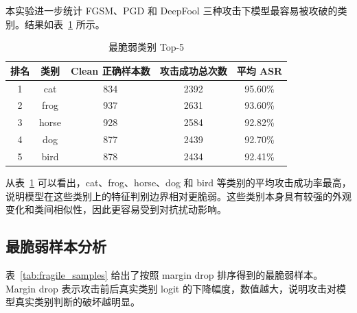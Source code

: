 \documentclass[UTF8,a4paper,12pt]{ctexart}
\begin{document}
本实验进一步统计 FGSM、PGD 和 DeepFool 三种攻击下模型最容易被攻破的类别。结果如表~\ref{tab:fragile_classes} 所示。

\begin{table}[H]
    \centering
    \caption{最脆弱类别 Top-5}
    \begin{tabular}{ccccc}
        \toprule
        排名 & 类别 & Clean 正确样本数 & 攻击成功总次数 & 平均 ASR \\
        \midrule
        1 & cat & 834 & 2392 & 95.60\% \\
        2 & frog & 937 & 2631 & 93.60\% \\
        3 & horse & 928 & 2584 & 92.82\% \\
        4 & dog & 877 & 2439 & 92.70\% \\
        5 & bird & 878 & 2434 & 92.41\% \\
        \bottomrule
    \end{tabular}
    \label{tab:fragile_classes}
\end{table}

从表~\ref{tab:fragile_classes} 可以看出，cat、frog、horse、dog 和 bird 等类别的平均攻击成功率最高，说明模型在这些类别上的特征判别边界相对更脆弱。这些类别本身具有较强的外观变化和类间相似性，因此更容易受到对抗扰动影响。

\subsection{最脆弱样本分析}

表~\ref{tab:fragile_samples} 给出了按照 margin drop 排序得到的最脆弱样本。Margin drop 表示攻击前后真实类别 logit 的下降幅度，数值越大，说明攻击对模型真实类别判断的破坏越明显。

\begin{table}[H]
    \centering
    \caption{最脆弱样本 Top-10}
    \label{tab:fragile_samples}
\end{table}
\end{document}
